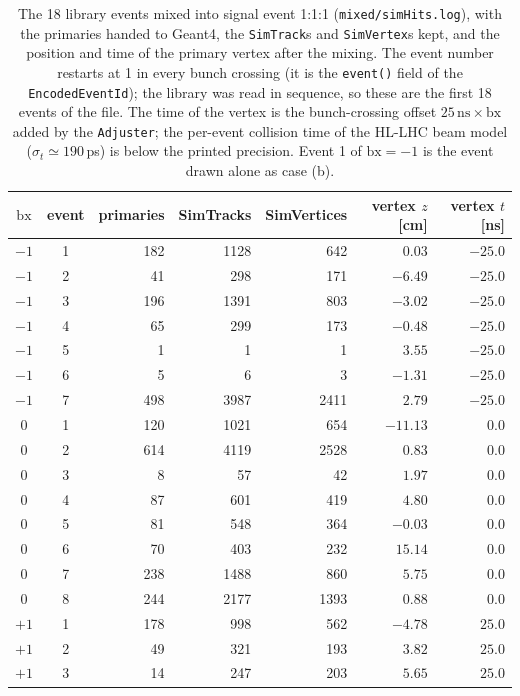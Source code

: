 \documentclass[11pt,a4paper]{article}
\newcommand{\code}[1]{\texttt{#1}}
\newcommand{\bx}{\ensuremath{\mathrm{bx}}}
\newcommand{\ns}{\,\mathrm{ns}}
\begin{document}
\begin{table}[H]
\centering\small
\caption{The 18 library events mixed into signal event 1:1:1 (\code{mixed/simHits.log}), with the
primaries handed to Geant4, the \code{SimTrack}s and \code{SimVertex}s kept, and the position and time of
the primary vertex after the mixing. The event number restarts at 1 in every bunch crossing (it is the
\code{event()} field of the \code{EncodedEventId}); the library was read in sequence, so these are the
first 18 events of the file. The time of the vertex is the bunch-crossing offset $25\ns\times\bx$ added by
the \code{Adjuster}; the per-event collision time of the HL-LHC beam model ($\sigma_t\simeq190$\,ps) is
below the printed precision. Event 1 of $\bx=-1$ is the event drawn alone as case (b).}
\label{tab:mixedevents}
\begin{tabular}{ccrrrrr}
\toprule
$\bx$ & event & primaries & SimTracks & SimVertices & vertex $z$ [cm] & vertex $t$ [ns] \\
\midrule
$-1$ & 1 & 182 & 1128 &  642 &  $0.03$ & $-25.0$ \\
$-1$ & 2 &  41 &  298 &  171 & $-6.49$ & $-25.0$ \\
$-1$ & 3 & 196 & 1391 &  803 & $-3.02$ & $-25.0$ \\
$-1$ & 4 &  65 &  299 &  173 & $-0.48$ & $-25.0$ \\
$-1$ & 5 &   1 &    1 &    1 &  $3.55$ & $-25.0$ \\
$-1$ & 6 &   5 &    6 &    3 & $-1.31$ & $-25.0$ \\
$-1$ & 7 & 498 & 3987 & 2411 &  $2.79$ & $-25.0$ \\
\midrule
 $0$ & 1 & 120 & 1021 &  654 & $-11.13$ & $0.0$ \\
 $0$ & 2 & 614 & 4119 & 2528 &  $0.83$ & $0.0$ \\
 $0$ & 3 &   8 &   57 &   42 &  $1.97$ & $0.0$ \\
 $0$ & 4 &  87 &  601 &  419 &  $4.80$ & $0.0$ \\
 $0$ & 5 &  81 &  548 &  364 & $-0.03$ & $0.0$ \\
 $0$ & 6 &  70 &  403 &  232 & $15.14$ & $0.0$ \\
 $0$ & 7 & 238 & 1488 &  860 &  $5.75$ & $0.0$ \\
 $0$ & 8 & 244 & 2177 & 1393 &  $0.88$ & $0.0$ \\
\midrule
$+1$ & 1 & 178 &  998 &  562 & $-4.78$ & $25.0$ \\
$+1$ & 2 &  49 &  321 &  193 &  $3.82$ & $25.0$ \\
$+1$ & 3 &  14 &  247 &  203 &  $5.65$ & $25.0$ \\

\end{tabular}
\end{table}
\end{document}
